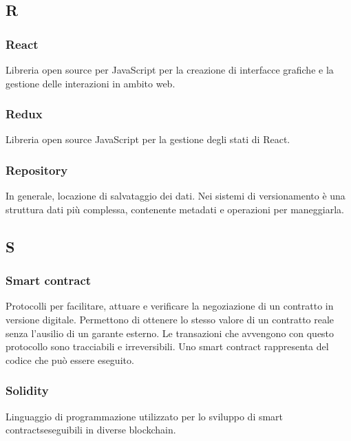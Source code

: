 \subsection*{R}

\subsubsection*{React}
Libreria open source per JavaScript per la creazione di interfacce grafiche e la gestione delle interazioni in ambito web.

\subsubsection*{Redux}
Libreria open source JavaScript per la gestione degli stati di React\glo.

\subsubsection*{Repository}
In generale, locazione di salvataggio dei dati. Nei sistemi di versionamento è una struttura dati più complessa, contenente metadati e operazioni per maneggiarla.


\subsection*{S}



\subsubsection*{Smart contract}
Protocolli per facilitare, attuare e verificare la negoziazione di un contratto in versione digitale. Permettono di ottenere lo stesso valore di un contratto reale senza l'ausilio di un garante esterno. Le transazioni che avvengono con questo protocollo sono tracciabili e irreversibili. Uno smart contract rappresenta del codice che può essere eseguito.

\subsubsection*{Solidity}
Linguaggio di programmazione utilizzato per lo sviluppo di smart contracts\glosp eseguibili in diverse blockchain\glo.

